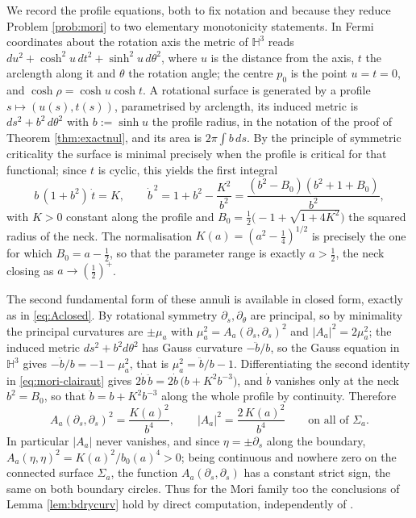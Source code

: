 \documentclass[11pt,a4paper]{amsart}
\theoremstyle{plain}
\theoremstyle{definition}
\newcommand{\Hyp}{\mathbb{H}}
\begin{document}
We record the profile equations, both to fix notation and because they reduce Problem \ref{prob:mori} to two elementary monotonicity statements. In Fermi coordinates about the rotation axis the metric of $\Hyp^3$ reads $du^2+\cosh^2u\,dt^2+\sinh^2u\,d\theta^2$, where $u$ is the distance from the axis, $t$ the arclength along it and $\theta$ the rotation angle; the centre $p_0$ is the point $u=t=0$, and $\cosh\rho=\cosh u\cosh t$. A rotational surface is generated by a profile $s\mapsto(u(s),t(s))$, parametrised by arclength, its induced metric is $ds^2+b^2\,d\theta^2$ with $b:=\sinh u$ the profile radius, in the notation of the proof of Theorem \ref{thm:exactnul}, and its area is $2\pi\int b\,ds$. By the principle of symmetric criticality the surface is minimal precisely when the profile is critical for that functional; since $t$ is cyclic, this yields the first integral
\begin{equation}\label{eq:mori-clairaut}
b\,(1+b^2)\,\dot t=K,\qquad
\dot b^{\,2}=1+b^2-\frac{K^2}{b^2}=\frac{(b^2-B_0)(b^2+1+B_0)}{b^2},
\end{equation}
with $K>0$ constant along the profile and $B_0=\tfrac12\bigl(-1+\sqrt{1+4K^2}\bigr)$ the squared radius of the neck. The normalisation $K(a)=(a^2-\tfrac14)^{1/2}$ is precisely the one for which $B_0=a-\tfrac12$, so that the parameter range is exactly $a>\tfrac12$, the neck closing as $a\to(\tfrac12)^{+}$.

The second fundamental form of these annuli is available in closed form, exactly as in \eqref{eq:Aclosed}. By rotational symmetry $\partial_s,\partial_\theta$ are principal, so by minimality the principal curvatures are $\pm\mu_a$ with $\mu_a^2=A_a(\partial_s,\partial_s)^2$ and $|A_a|^2=2\mu_a^2$; the induced metric $ds^2+b^2d\theta^2$ has Gauss curvature $-\ddot b/b$, so the Gauss equation in $\Hyp^3$ gives $-\ddot b/b=-1-\mu_a^2$, that is $\mu_a^2=\ddot b/b-1$. Differentiating the second identity in \eqref{eq:mori-clairaut} gives $2\dot b\,\ddot b=2\dot b\,\bigl(b+K^2b^{-3}\bigr)$, and $\dot b$ vanishes only at the neck $b^2=B_0$, so that $\ddot b=b+K^2b^{-3}$ along the whole profile by continuity. Therefore
\begin{equation}\label{eq:Aclosed-mori}
A_a(\partial_s,\partial_s)^2=\frac{K(a)^2}{b^4},\qquad |A_a|^2=\frac{2\,K(a)^2}{b^4}\qquad\text{on all of }\Sigma_a .
\end{equation}
In particular $|A_a|$ never vanishes, and since $\eta=\pm\partial_s$ along the boundary, $A_a(\eta,\eta)^2=K(a)^2/b_0(a)^4>0$; being continuous and nowhere zero on the connected surface $\Sigma_a$, the function $A_a(\partial_s,\partial_s)$ has a constant strict sign, the same on both boundary circles. Thus for the Mori family too the conclusions of Lemma \ref{lem:bdrycurv} hold by direct computation, independently of \cite{NZ1}.
\end{document}
